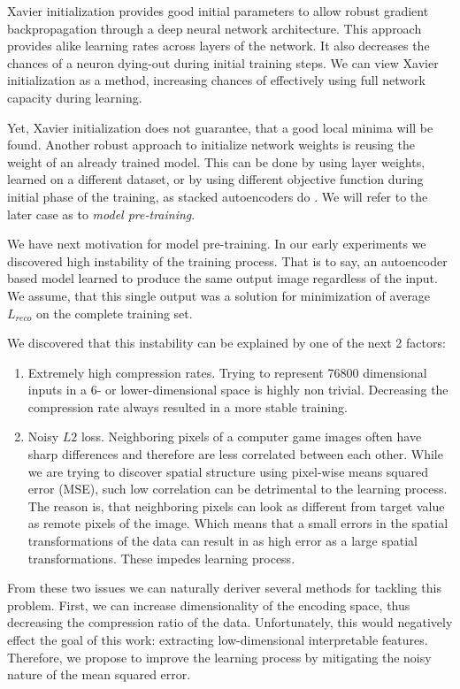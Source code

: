 Xavier initialization provides good initial parameters to allow robust gradient backpropagation through a deep neural network architecture.
This approach provides alike learning rates across layers of the network.
It also decreases the chances of a neuron dying-out during initial training steps.
We can view Xavier initialization as a method, increasing chances of effectively using full network capacity during learning.

Yet, Xavier initialization does not guarantee, that a good local minima will be found.
Another robust approach to initialize network weights is reusing the weight of an already trained model.
This can be done by using layer weights, learned on a different dataset, or by using different objective function during initial phase of the training, as stacked autoencoders do \cite{Yosinski2014}.
We will refer to the later case as to \textit{model pre-training}.

We have next motivation for model pre-training.
In our early experiments we discovered high instability of the training process.
That is to say, an autoencoder based model learned to produce the same output image regardless of the input.
We assume, that this single output was a solution for minimization of average $L_{reco}$ on the complete training set.

We discovered that this instability can be explained by one of the next 2 factors:
\begin{enumerate}
  \item Extremely high compression rates. Trying to represent 76800 dimensional inputs in a 6- or lower-dimensional space is highly non trivial. Decreasing the compression rate always resulted in a more stable training.
  \item Noisy $L2$ loss. Neighboring pixels of a computer game images often have sharp differences and therefore are less correlated between each other.
  While we are trying to discover spatial structure using pixel-wise means squared error (MSE), such low correlation can be detrimental to the learning process.
  The reason is, that neighboring pixels can look as different from target value as remote pixels of the image.
  Which means that a small errors in the spatial transformations of the data can result in as high error as a large spatial transformations.
  These impedes learning process.
\end{enumerate}

From these two issues we can naturally deriver several methods for tackling this problem.
First, we can increase dimensionality of the encoding space, thus decreasing the compression ratio of the data.
Unfortunately, this would negatively effect the goal of this work: extracting low-dimensional interpretable features.
Therefore, we propose to improve the learning process by mitigating the noisy nature of the mean squared error.

